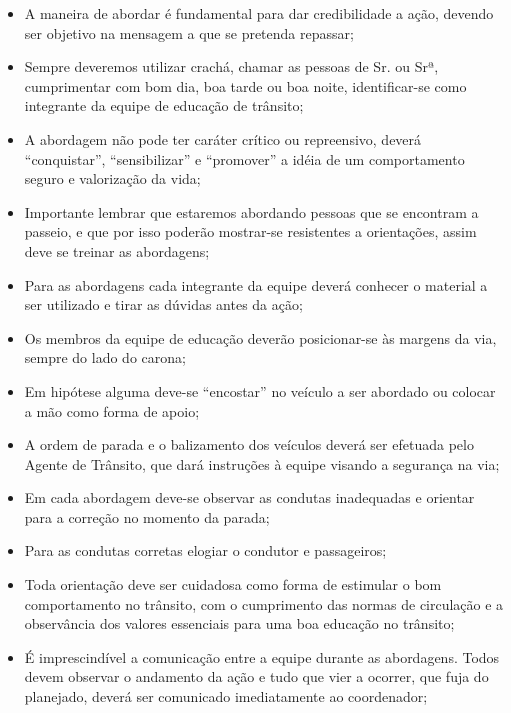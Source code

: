 \begin{itemize}
\item A  maneira de abordar é fundamental para dar credibilidade a ação, devendo ser objetivo na mensagem a que se pretenda repassar;
\item Sempre deveremos utilizar crachá, chamar as pessoas de Sr. ou Srª, cumprimentar com bom dia, boa tarde ou boa noite, identificar-se como integrante  da equipe de educação de trânsito;
\item A abordagem não pode ter caráter crítico ou repreensivo, deverá “conquistar”, “sensibilizar” e “promover”  a idéia de um comportamento seguro e valorização da vida;
\item Importante lembrar que estaremos abordando pessoas que se encontram a passeio, e que por isso poderão mostrar-se resistentes a orientações, assim deve se treinar as abordagens;
\item Para as abordagens cada integrante da equipe deverá conhecer o material a ser utilizado e tirar as dúvidas antes da ação;
\item Os membros da equipe de educação deverão posicionar-se às margens da via, sempre do lado do carona;
\item Em hipótese alguma deve-se “encostar” no veículo a ser abordado ou colocar a mão como forma de apoio;
\item A ordem de parada e o balizamento dos veículos deverá ser efetuada pelo Agente de Trânsito, que dará instruções à equipe visando a segurança na via; 
\item Em cada abordagem deve-se observar as condutas inadequadas e orientar para a correção no momento da parada;
\item Para as condutas corretas elogiar o condutor e passageiros; 
\item Toda orientação deve ser cuidadosa como forma de estimular o bom comportamento no trânsito, com o cumprimento das normas de circulação e a observância dos valores essenciais para uma boa educação no trânsito;
\item É imprescindível a comunicação entre a equipe durante as abordagens. Todos devem observar o andamento da ação e tudo que vier a ocorrer, que fuja do planejado, deverá ser comunicado imediatamente ao coordenador;
\end{itemize}




